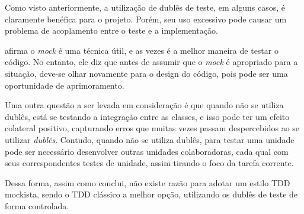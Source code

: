 Como visto anteriormente, a utilização de dublês de teste, em alguns casos, é claramente benéfica para o projeto. Porém, seu uso excessivo pode causar um problema de acoplamento entre o teste e a implementação.

 afirma o \textit{mock} é uma técnica útil, e as vezes é a melhor maneira de testar o código. No entanto, ele diz que antes de assumir que o \textit{mock} é apropriado para a situação, deve-se olhar novamente para o design do código, pois pode ser uma oportunidade de aprimoramento.

Uma outra questão a ser levada em consideração é que quando não se utiliza dublês, está se testando a integração entre as classes, e isso pode ter um efeito colateral positivo, capturando erros que muitas vezes passam despercebidos ao se utilizar \textit{dublês}. Contudo, quando não se utiliza dublês, para testar uma unidade pode ser necessário desenvolver outras unidades colaboradoras, cada qual com seus correspondentes testes de unidade, assim tirando o foco da tarefa corrente.

Dessa forma, assim como  conclui, não existe razão para adotar um estilo TDD mockista, sendo o TDD clássico a melhor opção, utilizando os dublês de teste de forma controlada.